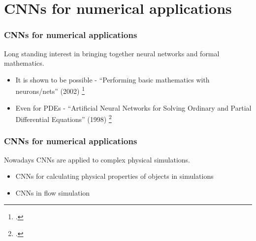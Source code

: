 \documentclass[18pt]{beamer}
\begin{document}
\section{CNNs for numerical applications}
\begin{frame}
  \frametitle{CNNs for numerical applications}
  Long standing interest in bringing together neural networks and formal mathematics.
  \begin{itemize}
  \item It is shown to be possible -  ``Performing basic mathematics with neurons/nets'' (2002)  \footcite{neville2002}
  \item Even for PDEs - ``Artificial Neural Networks for Solving Ordinary 
and Partial Differential Equations'' (1998) \footcite{lagaris1998}
  \end{itemize}
  
\end{frame}

\begin{frame}
  \frametitle{CNNs for numerical applications}
  Nowadays CNNs are applied to complex physical simulations.
  \begin{itemize}
  \item CNNs for calculating physical properties of objects in simulations
  \item CNNs in flow simulation
  \end{itemize}
  
\end{frame}
\end{document}
